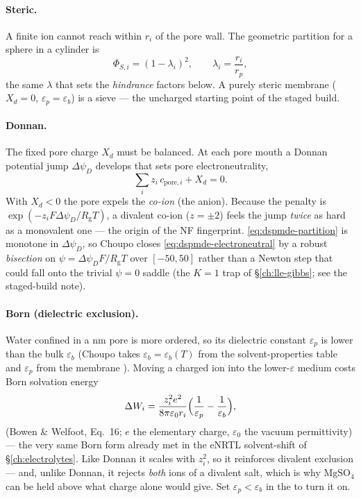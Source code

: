 \documentclass[11pt,a4paper]{article}
\newcommand{\Rgas}{R_{\!\mathrm{g}}}                %
\begin{document}
\paragraph{Steric.}  A finite ion cannot reach within $r_i$ of the pore
wall.  The geometric partition for a sphere in a cylinder is
\begin{equation}
   \Phi_{S,i} = (1-\lambda_i)^2,
   \qquad \lambda_i = \frac{r_i}{r_p},
   \label{eq:dspmde-steric}
\end{equation}
the same $\lambda$ that sets the \emph{hindrance} factors below.  A
purely steric membrane ($X_d=0$, $\varepsilon_p=\varepsilon_b$) is a
sieve --- the uncharged starting point of the staged build.

\paragraph{Donnan.}  The fixed pore charge $X_d$ must be balanced.  At
each pore mouth a Donnan potential jump $\Delta\psi_D$ develops that
sets pore electroneutrality,
\begin{equation}
   \sum_i z_i\, c_{\text{pore},i} + X_d = 0.
   \label{eq:dspmde-electroneutral}
\end{equation}
With $X_d<0$ the pore expels the \emph{co-ion} (the anion).  Because the
penalty is $\exp(-z_i F\Delta\psi_D/\Rgas T)$, a divalent co-ion
($z=\pm2$) feels the jump \emph{twice} as hard as a monovalent one ---
the origin of the NF fingerprint.  \eqref{eq:dspmde-partition} is
monotone in $\Delta\psi_D$, so Choupo closes
\eqref{eq:dspmde-electroneutral} by a robust \emph{bisection} on
$\psi=\Delta\psi_D F/\Rgas T$ over $[-50,50]$ rather than a Newton step
that could fall onto the trivial $\psi=0$ saddle (the $K=1$ trap of
\S\ref{ch:lle-gibbs}; see the staged-build note).

\paragraph{Born (dielectric exclusion).}  Water confined in a nm pore is
more ordered, so its dielectric constant $\varepsilon_p$ is lower than
the bulk $\varepsilon_b$ (Choupo takes $\varepsilon_b=\varepsilon_b(T)$
from the solvent-properties table and $\varepsilon_p$ from the membrane
).  Moving a charged ion into the lower-$\varepsilon$ medium
costs Born solvation energy
\begin{equation}
   \Delta W_i = \frac{z_i^2 e^2}{8\pi\varepsilon_0 r_i}
                \Bigl(\frac{1}{\varepsilon_p} - \frac{1}{\varepsilon_b}\Bigr),
   \label{eq:dspmde-born}
\end{equation}
(Bowen \& Welfoot, Eq.~16; $e$ the elementary charge, $\varepsilon_0$
the vacuum permittivity) --- the very same Born form already met in the
eNRTL solvent-shift of \S\ref{ch:electrolytes}.  Like Donnan it scales
with $z_i^2$, so it reinforces divalent exclusion --- and, unlike
Donnan, it rejects \emph{both} ions of a divalent salt, which is why
$\mathrm{MgSO_4}$ can be held above what charge alone would give.  Set
$\varepsilon_p<\varepsilon_b$ in the  to turn it on.
\end{document}
